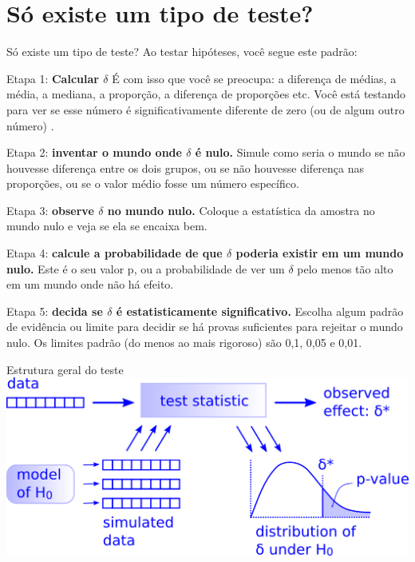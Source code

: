 \documentclass[
  9pt,
  ignorenonframetext,
  aspectratio=169]{beamer}
\begin{document}
\hypertarget{suxf3-existe-um-tipo-de-teste}{%
\section{Só existe um tipo de
teste?}\label{suxf3-existe-um-tipo-de-teste}}

\begin{frame}{Só existe um tipo de teste?}
Ao testar hipóteses, você segue este padrão:

Etapa 1: \textbf{Calcular \(\delta\)} É com isso que você se preocupa: a
diferença de médias, a média, a mediana, a proporção, a diferença de
proporções etc. Você está testando para ver se esse número é
significativamente diferente de zero (ou de algum outro número) .

Etapa 2: \textbf{inventar o mundo onde \(\delta\) é nulo.} Simule como
seria o mundo se não houvesse diferença entre os dois grupos, ou se não
houvesse diferença nas proporções, ou se o valor médio fosse um número
específico.

Etapa 3: \textbf{observe \(\delta\) no mundo nulo.} Coloque a
estatística da amostra no mundo nulo e veja se ela se encaixa bem.

Etapa 4: \textbf{calcule a probabilidade de que \(\delta\) poderia
existir em um mundo nulo.} Este é o seu valor p, ou a probabilidade de
ver um \(\delta\) pelo menos tão alto em um mundo onde não há efeito.

Etapa 5: \textbf{decida se \(\delta\) é estatisticamente significativo.}
Escolha algum padrão de evidência ou limite para decidir se há provas
suficientes para rejeitar o mundo nulo. Os limites padrão (do menos ao
mais rigoroso) são 0,1, 0,05 e 0,01.
\end{frame}

\begin{frame}{Estrutura geral do teste}
\protect\hypertarget{estrutura-geral-do-teste}{}
\includegraphics{imgs/there_is_only_one_test.png}
\end{frame}
\end{document}
